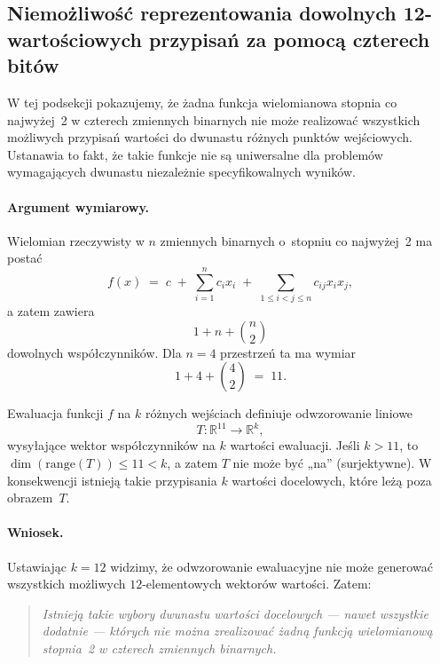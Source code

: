 \subsection{Niemożliwość reprezentowania dowolnych 12-war\-to\-ścio\-wych przypisań za pomocą czterech bitów}

W tej podsekcji pokazujemy, że żadna funkcja wielomianowa stopnia co najwyżej~2 w czterech zmiennych binarnych nie może realizować wszystkich możliwych przypisań wartości do dwunastu różnych punktów wejściowych. Ustanawia to fakt, że takie funkcje nie są uniwersalne dla problemów wymagających dwunastu niezależnie specyfikowalnych wyników.

\paragraph{Argument wymiarowy.}
Wielomian rzeczywisty w $n$ zmiennych binarnych o~stopniu co najwyżej~2 ma postać
\begin{equation}
f(x) \;=\; c \;+\; \sum_{i=1}^{n} c_i x_i \;+\; \sum_{1 \le i < j \le n} c_{ij} x_i x_j,
\end{equation}
a zatem zawiera
\begin{equation}
1 + n + \binom{n}{2}
\end{equation}
dowolnych współczynników.  
Dla $n = 4$ przestrzeń ta ma wymiar
\begin{equation}
1 + 4 + \binom{4}{2} \;=\; 11.
\end{equation}

Ewaluacja funkcji $f$ na $k$ różnych wejściach definiuje odwzorowanie liniowe
\begin{equation}
T : \mathbb{R}^{11} \longrightarrow \mathbb{R}^{k},
\end{equation}
wysyłające wektor współczynników na $k$ wartości ewaluacji.  
Jeśli $k > 11$, to $\dim(\mathrm{range}(T)) \le 11 < k$, a zatem $T$ nie może być „na” (surjektywne). W konsekwencji istnieją takie przypisania $k$ wartości docelowych, które leżą poza obrazem~$T$.

\paragraph{Wniosek.}
Ustawiając $k = 12$ widzimy, że odwzorowanie ewaluacyjne nie może generować wszystkich możliwych $12$-elementowych wektorów wartości. Zatem:

\begin{quote}
\emph{Istnieją takie wybory dwunastu wartości docelowych — nawet wszystkie dodatnie — których nie można zrealizować żadną funkcją wielomianową stopnia~2 w czterech zmiennych binarnych.}
\end{quote}

